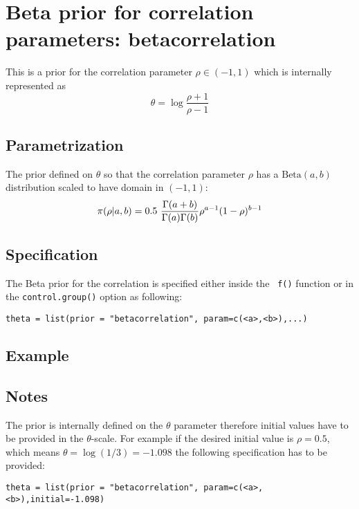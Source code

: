 \documentclass[a4paper,11pt]{article}
\begin{document}
\section*{Beta prior for correlation parameters: betacorrelation}

This is a prior for the correlation parameter $\rho\in(-1,1)$ which is
internally represented as
\[
\theta = \log\frac{\rho+1}{\rho-1}
\]

\subsection*{Parametrization}

The prior defined on $\theta$ so that the correlation parameter $\rho$
has a $\text{Beta}(a,b)$ distribution scaled to have domain in
$(-1,1)$:
\[
\pi(\rho|a,b) = 0.5\ {\Gamma(a+b) \over \Gamma(a) \Gamma(b)}
\rho^{a-1} (1-\rho)^{b-1} 
\]  


\subsection*{Specification}
The Beta prior for the correlation is specified either inside the {\tt
  f()} function or in the {\tt control.group()} option as following:
\begin{center}
{\tt theta = list(prior = "betacorrelation", param=c(<a>,<b>),...)}
\end{center}
\subsection*{Example}


\subsection*{Notes}

The prior is internally defined on the $\theta$ parameter therefore
initial values have to be provided in the $\theta$-scale. For example
if the desired initial value is $\rho=0.5$, which means
$\theta=\log(1/3)=-1.098$ the following specification has to be
provided:
\begin{center}
{\tt theta = list(prior = "betacorrelation", param=c(<a>,<b>),initial=-1.098)}
\end{center}
\end{document}
